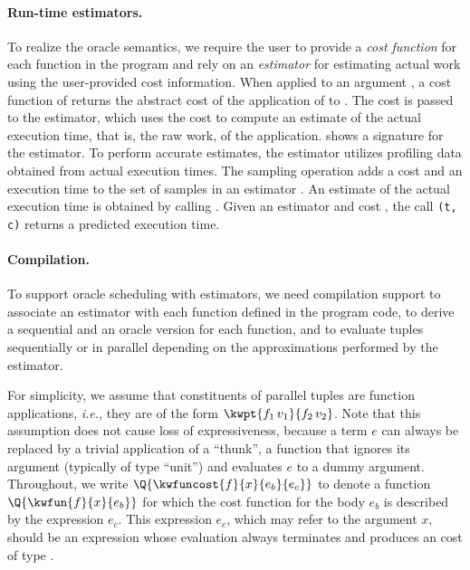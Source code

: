 \paragraph{Run-time estimators.}
To realize the oracle semantics, we require the user to provide a {\em
  cost function} for each function in the program and rely on an {\em
  estimator} for estimating actual work using the user-provided cost
information.  When applied to an argument , a cost function of
 returns the abstract cost of the application of  to
. The cost is passed to the estimator, which uses the cost to
compute an estimate of the actual execution time, that is, the raw
work, of the application.   shows a signature
for the estimator. To perform accurate estimates, the estimator
utilizes profiling data obtained from actual execution times. The
sampling operation 
 adds a cost  and an execution time  to the set of
 samples in an estimator . An estimate of the actual execution
 time is obtained by calling .  Given an estimator
  and cost , the call
\texttt{\kwestimatorapp(t, c)}
returns a predicted execution time.



\paragraph{Compilation.}

To support oracle scheduling with estimators, we need compilation
support to associate an estimator with each function defined in the
program code, to derive a sequential and an oracle version for each
function, and to evaluate tuples sequentially or in parallel depending
on the approximations performed by the estimator.  

For simplicity, we assume that constituents of parallel tuples are
function applications, \textit{i.e.}, they are of the form
$\kwpt{f_1\,v_1}{f_2\,v_2}$.  Note that this assumption does not cause
loss of expressiveness, because a term $e$ can always be replaced by a
trivial application of a ``thunk'', a function that ignores its
argument (typically of type ``unit'') and evaluates $e$ to a dummy
argument. Throughout, we write $\Q{\kwfuncost{f}{x}{e_b}{e_c}}$ to
denote a function $\Q{\kwfun{f}{x}{e_b}}$ for which the cost function
for the body $e_b$ is described by the expression $e_c$.  This
expression $e_c$, which may refer to the argument $x$, should be an
expression whose evaluation always terminates and produces an cost of
type \kwtypeofcost.

